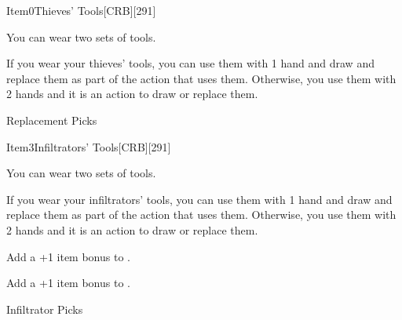 

\begin{card}{Item}{0}{Thieves' Tools}[CRB][291]

{\footnotesize
You can wear two sets of tools.

If you wear your thieves' tools, you can use them with 1 hand and draw and replace them as part of the action that uses them.
Otherwise, you use them with 2 hands and it is an action to draw or replace them.
}


Replacement Picks \ItemPrice{3sp}

\vfill

\end{card}


\begin{card}{Item}{3}{Infiltrators' Tools}[CRB][291]

{\footnotesize
You can wear two sets of tools.

If you wear your infiltrators' tools, you can use them with 1 hand and draw and replace them as part of the action that uses them.
Otherwise, you use them with 2 hands and it is an action to draw or replace them.
}


Add a +1 item bonus to .


Add a +1 item bonus to .

Infiltrator Picks 

\vfill

\end{card}

